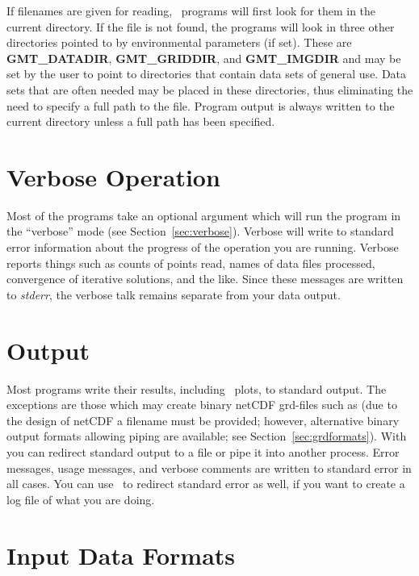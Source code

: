 If filenames are given for reading, \GMT\ programs will first look for them in the
current directory.  If the file is not found, the programs
will look in three other directories pointed to by environmental
parameters (if set).  These are {\bf GMT\_DATADIR}, {\bf GMT\_GRIDDIR}, and
{\bf GMT\_IMGDIR} and may be set by the user to point to directories
that contain data sets of general use.  Data sets that are often needed
may be placed in these directories, thus eliminating the need to specify
a full path to the file.  Program output is always written to the
current directory unless a full path has been specified.

\section{Verbose Operation}

Most of the programs take an optional  argument
which will run the program in the ``verbose'' mode (see Section~\ref{sec:verbose}).
Verbose will write to standard error information about the progress
of the operation you are running.  Verbose reports things
such as counts of points read, names of data files
processed, convergence of iterative solutions, and the like.
Since these messages are written to {\it stderr},  the
verbose talk remains separate from your data output. 

\section{Output}

Most programs write their results, including \PS\
plots, to standard output.  The exceptions are those which may
create binary netCDF grd-files such as  (due to
the design of netCDF a filename must be provided; however,
alternative binary output formats allowing piping are available; see Section~\ref{sec:grdformats}).
With \UNIX\, you can redirect standard output to a file or pipe it
into another process.  Error messages, usage messages, and
verbose comments are written to standard error in all cases.
You can use \UNIX\ to redirect standard error as well,
if you want to create a log file of what you are doing. 

\section{Input Data Formats}
\label{sec:io}


